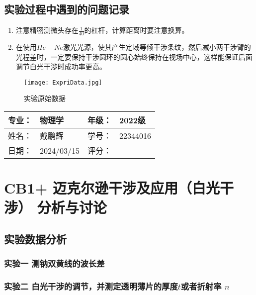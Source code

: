 \documentclass[dvipsnames, svgnames,a4paper,11pt]{article}
\begin{document}
\subsection{实验过程中遇到的问题记录}

\begin{enumerate}
	\item 注意精密测微头存在$\frac{1}{40}$的杠杆，计算距离时要注意换算。
	
	\item 在使用$He-Ne$激光光源，使其产生定域等倾干涉条纹，然后减小两干涉臂的光程差时，一定要保持干涉圆环的圆心始终保持在视场中心，这样能保证后面调节白光干涉时成功率更高。
	
\end{enumerate}
	
	\begin{figure}[htbp]
		\centering
		\texttt{[image: ExpriData.jpg]}
		\caption{实验原始数据}
		\label{fig:ExpriData}
	\end{figure}

\clearpage
\begin{table}
	\renewcommand\arraystretch{1.7}
	\begin{tabularx}{\textwidth}{|X|X|X|X|}
	\hline
	专业：& 物理学 &年级：& 2022级\\
	\hline
	姓名： & 戴鹏辉 & 学号：& 22344016\\
	\hline
    日期：& 2024/03/15 & 评分： &\\
	\hline
	\end{tabularx}
\end{table}

\section{CB1+ \quad 迈克尔逊干涉及应用（白光干涉） \quad\heiti 分析与讨论}

\subsection{实验数据分析}

	\subsubsection{实验一 测钠双黄线的波长差}
		
		
		
		
		
	\subsubsection{实验二 白光干涉的调节，并测定透明薄片的厚度$t$或者折射率 $n$}
			
\end{document}
